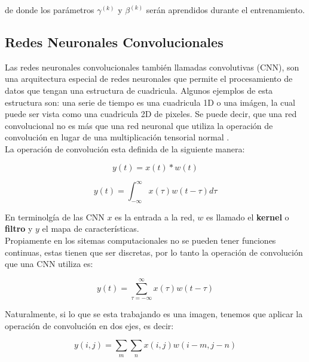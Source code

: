 	de donde los parámetros $\gamma^{(k)}$ y $\beta^{(k)}$ serán aprendidos durante el entrenamiento.

    \subsection{Redes Neuronales Convolucionales}
    
    Las redes neuronales convolucionales también llamadas convolutivas (CNN), son una arquitectura especial de redes neuronales que permite el procesamiento de datos que tengan una estructura de cuadricula. Algunos ejemplos de esta estructura son: una serie de tiempo es una cuadricula 1D o una imágen, la cual puede ser vista como una cuadricula 2D de pixeles. Se puede decir, que una red convolucional no es más que una red neuronal que utiliza la operación de convolución en lugar de una multiplicación tensorial normal \cite{deeplearningbook}. \\
    
    La operación de convolución esta definida de la siguiente manera:
    
	\begin{equation}
		y(t) = x(t) * w(t)
	\end{equation}

    \begin{equation}
    	y(t) = \int_{-\infty}^{\infty} x(\tau)w(t-\tau)d\tau
    \end{equation}
    
    En terminolgía de las CNN $x$ es la entrada a la red, $w$ es llamado el \textbf{kernel} o \textbf{filtro} y $y$ el mapa de características. \\
    
    Propiamente en los sitemas computacionales no se pueden tener funciones continuas, estas tienen que ser discretas, por lo tanto la operación de convolución que una CNN utiliza es:
    
    \begin{equation}
    	y(t) = \sum_{\tau = -\infty}^{\infty} x(\tau)w(t-\tau)
    \end{equation}
    
    Naturalmente, si lo que se esta trabajando es una imagen, tenemos que aplicar la operación de convolución en dos ejes, es decir:
    
    \begin{equation}
    	y(i,j) = \sum_{m}\sum_{n} x(i,j)w(i-m, j-n)
    \end{equation}

